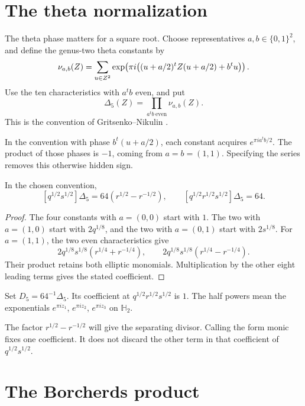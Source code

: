 \section{The theta normalization}
\label{sec:view1-theta-normalization}

The theta phase matters for a square root.  Choose representatives
\(a,b\in\{0,1\}^2\), and define the genus-two theta constants by
\[
 \nu_{a,b}(Z)=
 \sum_{u\in Z^2}
 \exp\!\left(\pi i\bigl((u+a/2)^tZ(u+a/2)+b^tu\bigr)\right).
\]
Use the ten characteristics with \(a^tb\) even, and put
\[
 \Delta_5(Z)=\prod_{a^tb\ \mathrm{even}}\nu_{a,b}(Z).
\]
This is the convention of Gritsenko--Nikulin
\cite[(1.2)]{GN}.

In the convention with phase
\(b^t(u+a/2)\), each constant acquires
\(e^{\pi i a^tb/2}\).  The product of those phases is \(-1\),
coming from \(a=b=(1,1)\).  Specifying the series removes this
otherwise hidden sign.

\begin{proposition}
\label{prop:view1-theta-constant-leading-coefficient}
In the chosen convention,
\[
 [q^{1/2}s^{1/2}]\Delta_5
 =64(r^{1/2}-r^{-1/2}),\qquad
 [q^{1/2}r^{1/2}s^{1/2}]\Delta_5=64.
\]
\end{proposition}

\begin{proof}
The four constants with \(a=(0,0)\) start with \(1\).
The two with \(a=(1,0)\) start with \(2q^{1/8}\), and the two
with \(a=(0,1)\) start with \(2s^{1/8}\).
For \(a=(1,1)\), the two even characteristics give
\[
 2q^{1/8}s^{1/8}(r^{1/4}+r^{-1/4}),\qquad
 2q^{1/8}s^{1/8}(r^{1/4}-r^{-1/4}).
\]
Their product retains both elliptic monomials.  Multiplication by
the other eight leading terms gives the stated coefficient.
\end{proof}

\begin{definition}
\label{def:view1-monic-Borcherds-Gritsenko-form}
Set \(D_5=64^{-1}\Delta_5\).
Its coefficient at \(q^{1/2}r^{1/2}s^{1/2}\) is \(1\).
The half powers mean the exponentials
\(e^{\pi iz_1}\), \(e^{\pi iz_2}\), \(e^{\pi iz_3}\) on
\(\mathbb H_2\).
\end{definition}

The factor \(r^{1/2}-r^{-1/2}\) will give the separating divisor.
Calling the form monic fixes one coefficient.  It does not discard
the other term in that coefficient of \(q^{1/2}s^{1/2}\).

\section{The Borcherds product}
\label{sec:view1-borcherds-gritsenko-nikulin-section}
\label{ssec:view1-product-expansion}

